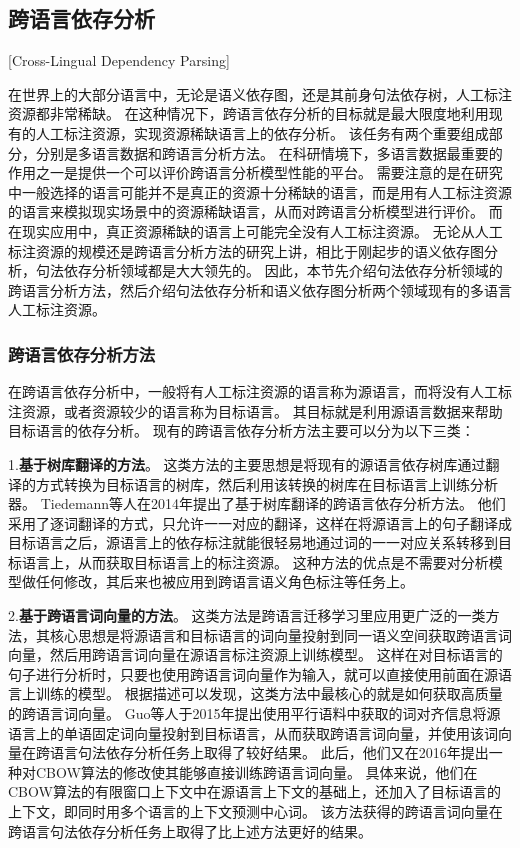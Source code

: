 \subsection{跨语言依存分析}[Cross-Lingual Dependency Parsing]

在世界上的大部分语言中，无论是语义依存图，还是其前身句法依存树，人工标注资源都非常稀缺。
在这种情况下，跨语言依存分析的目标就是最大限度地利用现有的人工标注资源，实现资源稀缺语言上的依存分析。
该任务有两个重要组成部分，分别是多语言数据和跨语言分析方法。
在科研情境下，多语言数据最重要的作用之一是提供一个可以评价跨语言分析模型性能的平台。
需要注意的是在研究中一般选择的语言可能并不是真正的资源十分稀缺的语言，而是用有人工标注资源的语言来模拟现实场景中的资源稀缺语言，从而对跨语言分析模型进行评价。
而在现实应用中，真正资源稀缺的语言上可能完全没有人工标注资源。
无论从人工标注资源的规模还是跨语言分析方法的研究上讲，相比于刚起步的语义依存图分析，句法依存分析领域都是大大领先的。
因此，本节先介绍句法依存分析领域的跨语言分析方法，然后介绍句法依存分析和语义依存图分析两个领域现有的多语言人工标注资源。

\subsubsection{跨语言依存分析方法}

在跨语言依存分析中，一般将有人工标注资源的语言称为源语言，而将没有人工标注资源，或者资源较少的语言称为目标语言。
其目标就是利用源语言数据来帮助目标语言的依存分析。
现有的跨语言依存分析方法主要可以分为以下三类：

1.\textbf{基于树库翻译的方法}。
这类方法的主要思想是将现有的源语言依存树库通过翻译的方式转换为目标语言的树库，然后利用该转换的树库在目标语言上训练分析器。
Tiedemann等人在2014年提出了基于树库翻译的跨语言依存分析方法\cite{tiedemann-etal-2014-treebank}。
他们采用了逐词翻译的方式，只允许一一对应的翻译，这样在将源语言上的句子翻译成目标语言之后，源语言上的依存标注就能很轻易地通过词的一一对应关系转移到目标语言上，从而获取目标语言上的标注资源。
这种方法的优点是不需要对分析模型做任何修改，其后来也被应用到跨语言语义角色标注等任务上\cite{fei-etal-2020-cross}。


2.\textbf{基于跨语言词向量的方法}。
这类方法是跨语言迁移学习里应用更广泛的一类方法，其核心思想是将源语言和目标语言的词向量投射到同一语义空间获取跨语言词向量，然后用跨语言词向量在源语言标注资源上训练模型。
这样在对目标语言的句子进行分析时，只要也使用跨语言词向量作为输入，就可以直接使用前面在源语言上训练的模型。
根据描述可以发现，这类方法中最核心的就是如何获取高质量的跨语言词向量。
Guo等人\cite{guo-etal-2015-cross}于2015年提出使用平行语料中获取的词对齐信息将源语言上的单语固定词向量投射到目标语言，从而获取跨语言词向量，并使用该词向量在跨语言句法依存分析任务上取得了较好结果。
此后，他们又在2016年提出一种对CBOW算法的修改使其能够直接训练跨语言词向量\cite{guo-etal-2016-representation}。
具体来说，他们在CBOW算法的有限窗口上下文中在源语言上下文的基础上，还加入了目标语言的上下文，即同时用多个语言的上下文预测中心词。
该方法获得的跨语言词向量在跨语言句法依存分析任务上取得了比上述方法更好的结果。

